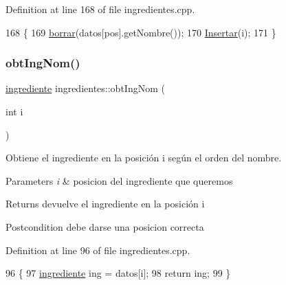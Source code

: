 Definition at line 168 of file ingredientes.\+cpp.


\begin{DoxyCode}
168                                                 \{
169     \hyperlink{classingredientes_a35403b690f689a21f4d179e25e25ff48}{borrar}(datos[pos].getNombre());
170     \hyperlink{classingredientes_abbf5ea48179d79c13e5abd6c09393ada}{Insertar}(i);
171 \}
\end{DoxyCode}
\mbox{\label{classingredientes_ad77fd43aa6ab52bb7f0bf547cb4bc777}} 
\subsubsection{\texorpdfstring{obt\+Ing\+Nom()}{obtIngNom()}}
{\footnotesize\ttfamily \hyperlink{classingrediente}{ingrediente} ingredientes\+::obt\+Ing\+Nom (\begin{DoxyParamCaption}\item[{int}]{i }\end{DoxyParamCaption})}



Obtiene el ingrediente en la posición i según el orden del nombre. 


\begin{DoxyParams}{Parameters}
{\em i} & posicion del ingrediente que queremos \\
\hline
\end{DoxyParams}
\begin{DoxyReturn}{Returns}
devuelve el ingrediente en la posición i 
\end{DoxyReturn}
\begin{DoxyPostcond}{Postcondition}
debe darse una posicion correcta 
\end{DoxyPostcond}


Definition at line 96 of file ingredientes.\+cpp.


\begin{DoxyCode}
96                                         \{
97     \hyperlink{classingrediente}{ingrediente} ing = datos[i];
98     \textcolor{keywordflow}{return} ing;
99 \}
\end{DoxyCode}
\mbox{\label{classingredientes_afc77feaa95ef6885c9f4e0bbeef746a4}} 
